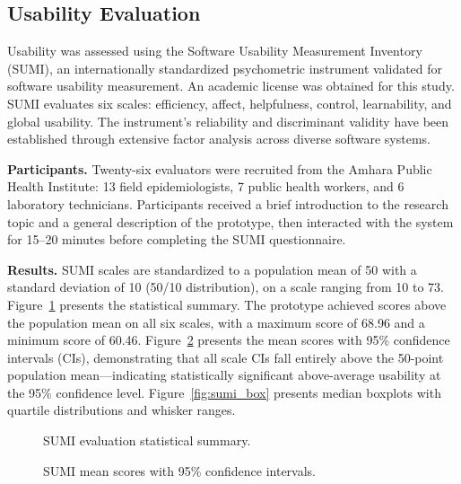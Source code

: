 \documentclass[AMA,LATO1COL]{WileyNJD-v2}
\begin{document}
\subsection{Usability Evaluation}\label{subsec:usability}

Usability was assessed using the Software Usability Measurement Inventory (SUMI), an internationally standardized psychometric instrument validated for software usability measurement. An academic license was obtained for this study. SUMI evaluates six scales: efficiency, affect, helpfulness, control, learnability, and global usability. The instrument's reliability and discriminant validity have been established through extensive factor analysis across diverse software systems.\cite{bevan1995measuring}

\textbf{Participants.} Twenty-six evaluators were recruited from the Amhara Public Health Institute: 13 field epidemiologists, 7 public health workers, and 6 laboratory technicians. Participants received a brief introduction to the research topic and a general description of the prototype, then interacted with the system for 15--20 minutes before completing the SUMI questionnaire.

\textbf{Results.} SUMI scales are standardized to a population mean of 50 with a standard deviation of 10 (50/10 distribution), on a scale ranging from 10 to 73. Figure~\ref{fig:sumi_summary} presents the statistical summary. The prototype achieved scores above the population mean on all six scales, with a maximum score of 68.96 and a minimum score of 60.46. Figure~\ref{fig:sumi_ci} presents the mean scores with 95\% confidence intervals (CIs), demonstrating that all scale CIs fall entirely above the 50-point population mean---indicating statistically significant above-average usability at the 95\% confidence level. Figure~\ref{fig:sumi_box} presents median boxplots with quartile distributions and whisker ranges.

\begin{figure}[!ht]
\centering
{}
\caption{SUMI evaluation statistical summary.}\label{fig:sumi_summary}
\end{figure}

\begin{figure}[!ht]
\centering
{}
\caption{SUMI mean scores with 95\% confidence intervals.}\label{fig:sumi_ci}
\end{figure}
\end{document}

